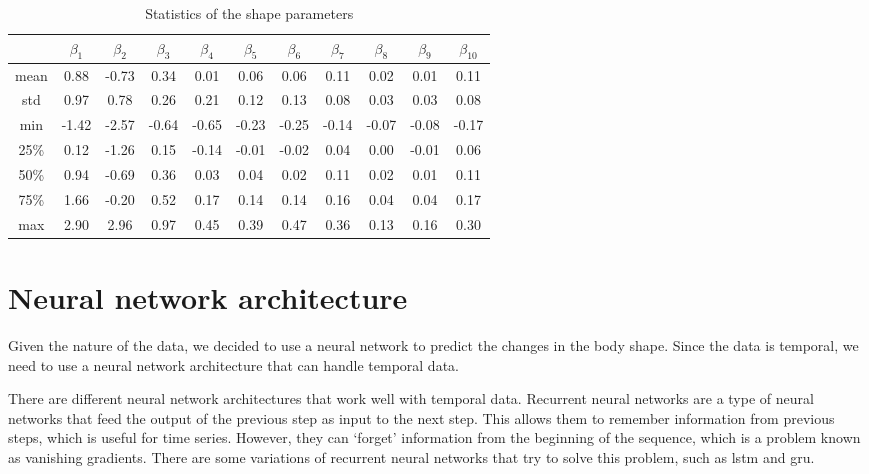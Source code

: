 \begin{table}[h]
    \centering
    \begin{tabular}{ |c|c|c|c|c|c|c|c|c|c|c| }
        \hline
             & $\beta_1$ & $\beta_2$ & $\beta_3$ & $\beta_4$ & $\beta_5$ & $\beta_6$ & $\beta_7$ & $\beta_8$ & $\beta_9$ & $\beta_{10}$ \\
        \hline
        mean & 0.88      & -0.73     & 0.34      & 0.01      & 0.06      & 0.06      & 0.11      & 0.02      & 0.01      & 0.11         \\
        \hline
        std  & 0.97      & 0.78      & 0.26      & 0.21      & 0.12      & 0.13      & 0.08      & 0.03      & 0.03      & 0.08         \\
        \hline
        min  & -1.42     & -2.57     & -0.64     & -0.65     & -0.23     & -0.25     & -0.14     & -0.07     & -0.08     & -0.17        \\
        \hline
        25\% & 0.12      & -1.26     & 0.15      & -0.14     & -0.01     & -0.02     & 0.04      & 0.00      & -0.01     & 0.06         \\
        \hline
        50\% & 0.94      & -0.69     & 0.36      & 0.03      & 0.04      & 0.02      & 0.11      & 0.02      & 0.01      & 0.11         \\
        \hline
        75\% & 1.66      & -0.20     & 0.52      & 0.17      & 0.14      & 0.14      & 0.16      & 0.04      & 0.04      & 0.17         \\
        \hline
        max  & 2.90      & 2.96      & 0.97      & 0.45      & 0.39      & 0.47      & 0.36      & 0.13      & 0.16      & 0.30         \\
        \hline
    \end{tabular}
    \caption{Statistics of the shape parameters}
\end{table}

\section{Neural network architecture}

Given the nature of the data, we decided to use a neural network to predict the
changes in the body shape. Since the data is temporal, we need to use a neural
network architecture that can handle temporal data.

There are different neural network architectures that work well with temporal
data. Recurrent neural networks are a type of neural networks that feed the
output of the previous step as input to the next step. This allows them to
remember information from previous steps, which is useful for time series.
However, they can `forget' information from the beginning of the sequence,
which is a problem known as vanishing gradients. There are some variations of
recurrent neural networks that try to solve this problem, such as \gls{lstm}
and \gls{gru}.

